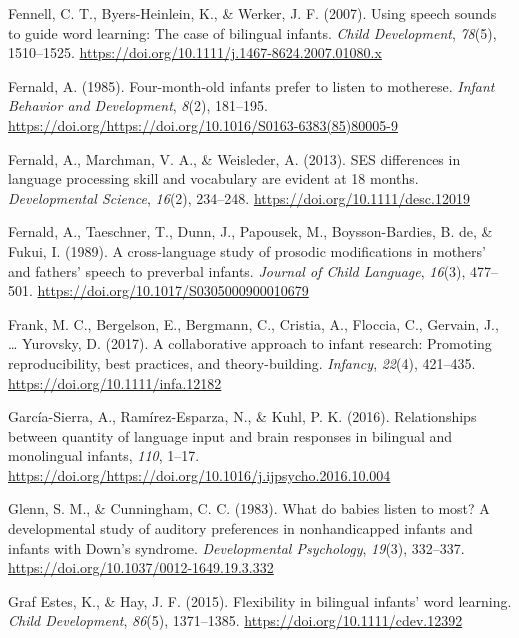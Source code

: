 \documentclass[,man,floatsintext]{apa6}
\begin{document}
\leavevmode\hypertarget{ref-fennell_2007}{}%
Fennell, C. T., Byers-Heinlein, K., \& Werker, J. F. (2007). Using speech sounds to guide word learning: The case of bilingual infants. \emph{Child Development}, \emph{78}(5), 1510--1525. \url{https://doi.org/10.1111/j.1467-8624.2007.01080.x}

\leavevmode\hypertarget{ref-fernald_1985}{}%
Fernald, A. (1985). Four-month-old infants prefer to listen to motherese. \emph{Infant Behavior and Development}, \emph{8}(2), 181--195. \url{https://doi.org/https://doi.org/10.1016/S0163-6383(85)80005-9}

\leavevmode\hypertarget{ref-fernald_2013}{}%
Fernald, A., Marchman, V. A., \& Weisleder, A. (2013). SES differences in language processing skill and vocabulary are evident at 18 months. \emph{Developmental Science}, \emph{16}(2), 234--248. \url{https://doi.org/10.1111/desc.12019}

\leavevmode\hypertarget{ref-fernald_1989}{}%
Fernald, A., Taeschner, T., Dunn, J., Papousek, M., Boysson-Bardies, B. de, \& Fukui, I. (1989). A cross-language study of prosodic modifications in mothers' and fathers' speech to preverbal infants. \emph{Journal of Child Language}, \emph{16}(3), 477--501. \url{https://doi.org/10.1017/S0305000900010679}

\leavevmode\hypertarget{ref-frank_2017}{}%
Frank, M. C., Bergelson, E., Bergmann, C., Cristia, A., Floccia, C., Gervain, J., \ldots{} Yurovsky, D. (2017). A collaborative approach to infant research: Promoting reproducibility, best practices, and theory-building. \emph{Infancy}, \emph{22}(4), 421--435. \url{https://doi.org/10.1111/infa.12182}

\leavevmode\hypertarget{ref-garcia_sierra_2016}{}%
García-Sierra, A., Ramírez-Esparza, N., \& Kuhl, P. K. (2016). Relationships between quantity of language input and brain responses in bilingual and monolingual infants, \emph{110}, 1--17. \url{https://doi.org/https://doi.org/10.1016/j.ijpsycho.2016.10.004}

\leavevmode\hypertarget{ref-glenn_1983}{}%
Glenn, S. M., \& Cunningham, C. C. (1983). What do babies listen to most? A developmental study of auditory preferences in nonhandicapped infants and infants with Down's syndrome. \emph{Developmental Psychology}, \emph{19}(3), 332--337. \url{https://doi.org/10.1037/0012-1649.19.3.332}

\leavevmode\hypertarget{ref-graf_estes_2015}{}%
Graf Estes, K., \& Hay, J. F. (2015). Flexibility in bilingual infants' word learning. \emph{Child Development}, \emph{86}(5), 1371--1385. \url{https://doi.org/10.1111/cdev.12392}
\end{document}
